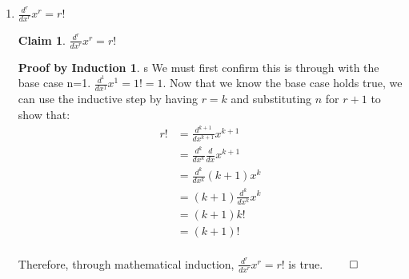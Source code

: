 \documentclass[11pt]{letter}
\newtheorem{claim}{Claim}
\theoremstyle{definition}
\newtheorem{PBI}{Proof by Induction}
\begin{document}
\begin{description}
\begin{enumerate}
			\item $\frac{d^r}{dx^r}x^r=r!$
\begin{claim}
$\frac{d^r}{dx^r}x^r=r!$
\end{claim}
\begin{PBI}s
We must first confirm this is through with the base case n=1. $\frac{d^1}{dx^1}x^1=1!=1$. Now that we know the base case holds true, we can use the inductive step by having $r=k$ and substituting $n$ for $r+1$ to show that:
\begin{align*}
r!&=\frac{d^{k+1}}{dx^{k+1}}x^{k+1} \\
&=\frac{d^k}{dx^k}\frac{d}{dx}x^{k+1} \\
&=\frac{d^k}{dx^k}(k+1)x^k \tag{substituted using inductive assumption} \\
&=(k+1)\frac{d^k}{dx^k}x^k \tag{Used the constant multiple rule of derivatives.} \\
&=(k+1)k! \tag{Substitutes equation given in the claim.} \\
&=(k+1)! \tag{Uses definition of factorial} \\
\end{align*}
\end{PBI}
Therefore, through mathematical induction, $\frac{d^r}{dx^r}x^r=r!$ is true. $\qed$


\end{enumerate}
\end{description}
\end{document}
